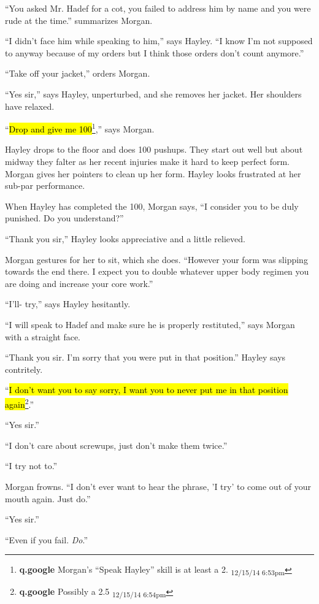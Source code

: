 ``You asked Mr. Hadef for a cot, you failed to address him by name and you were rude at the time.'' summarizes Morgan.

``I didn't face him while speaking to him,'' says Hayley.  ``I know I'm not supposed to anyway because of my orders but I think those orders don't count anymore.''

``Take off your jacket,'' orders Morgan.

``Yes sir,'' says Hayley, unperturbed, and she removes her jacket.  Her shoulders have relaxed.

``\hl{Drop and give me 100}\footnote{\textbf{q.google }Morgan's ``Speak Hayley'' skill is at least a 2. \textsubscript{12/15/14 6:53pm}},'' says Morgan.

Hayley drops to the floor and does 100 pushups. They start out well but about midway they falter as her recent injuries make it hard to keep perfect form.  Morgan gives her pointers to clean up her form.  Hayley looks frustrated at her sub-par performance.

When Hayley has completed the 100, Morgan says, ``I consider you to be duly punished.  Do you understand?''

``Thank you sir,'' Hayley looks appreciative and a little relieved.  

Morgan gestures for her to sit, which she does.  ``However your form was slipping towards the end there.  I expect you to double whatever upper body regimen you are doing and increase your core work.''

``I'll- try,'' says Hayley hesitantly.

``I will speak to Hadef and make sure he is properly restituted,'' says Morgan with a straight face.

``Thank you sir.  I'm sorry that you were put in that position.'' Hayley says contritely.

``\hl{I don't want you to say sorry, I want you to never put me in that position again}\footnote{\textbf{q.google }Possibly a 2.5 \textsubscript{12/15/14 6:54pm}}.''

``Yes sir.''

``I don't care about screwups, just don't make them twice.''

``I try not to.''

Morgan frowns.  ``I don't ever want to hear the phrase, 'I try' to come out of your mouth again.  Just do.''

``Yes sir.''

``Even if you fail.  \textit{Do}.''

